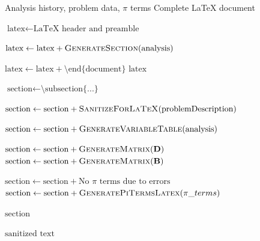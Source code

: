 \documentclass[
	11pt, %
	fleqn, %
	a4paper, %
]{LegrandOrangeBook}
\begin{document}
\begin{algorithm}[H]
\caption{LaTeX Export Generation with Sanitization}
\begin{algorithmic}[1]
\Require Analysis history, problem data, $\pi$ terms
\Ensure Complete LaTeX document

    \State $\text{latex} \gets \text{LaTeX header and preamble}$

        \State $\text{latex} \gets \text{latex} + \Call{GenerateSection}{\text{analysis}}$
    \EndFor

    \State $\text{latex} \gets \text{latex} + \text{\textbackslash end\{document\}}$
    \State \Return $\text{latex}$
\EndFunction

    \State $\text{section} \gets \text{\textbackslash subsection\{...\}}$

    \State {}
    \State $\text{section} \gets \text{section} + \Call{SanitizeForLaTeX}{\text{problemDescription}}$

    \State {}
    \State $\text{section} \gets \text{section} + \Call{GenerateVariableTable}{\text{analysis}}$

    \State {}
    \State $\text{section} \gets \text{section} + \Call{GenerateMatrix}{\mathbf{D}}$
    \State $\text{section} \gets \text{section} + \Call{GenerateMatrix}{\mathbf{B}}$

    \State {}
        \State $\text{section} \gets \text{section} + \text{No $\pi$ terms due to errors}$
    \Else
        \State $\text{section} \gets \text{section} + \Call{GeneratePiTermsLatex}{\pi\_terms}$
    \EndIf

    \State \Return $\text{section}$
\EndFunction

    \State {}
    \State \Return $\text{sanitized text}$
\EndFunction
\end{algorithmic}
\end{algorithm}
\end{document}
